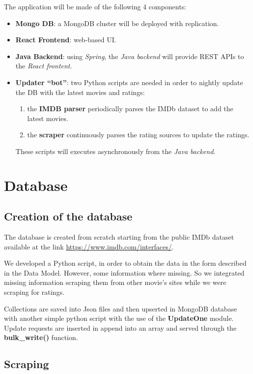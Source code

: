 \documentclass[11pt]{article}
\begin{document}
The application will be made of the following 4 components:
\begin{itemize}
	\item \textbf{Mongo DB}: a MongoDB cluster will be deployed with
		replication.
	\item \textbf{React Frontend}: web-based UI.
	\item \textbf{Java Backend}: using \emph{Spring}, the \emph{Java backend} will provide REST APIs to the \emph{React frontent}.
	\item \textbf{Updater ``bot''}: two Python scripts are needed in order to nightly update the DB with the latest movies and ratings: 
	\begin{enumerate}
		\item the \textbf{IMDB parser} periodically parses the IMDb dataset to add the latest movies.
		\item the \textbf{scraper} continuously parses the rating sources to update the ratings.
	\end{enumerate}
	These scripts will executes asynchronously from the \emph{Java backend}.
\end{itemize}


\section{Database}

\subsection{Creation of the database}
The database is created from scratch starting from the public IMDb dataset available at the link \href{https://www.imdb.com/interfaces/}{https://www.imdb.com/interfaces/}.

We developed a Python script, in order to obtain the data in the form described in the Data Model. However, some information where missing. So we integrated missing information scraping them from other movie's sites while we were scraping for ratings.

Collections are saved into Json files and then upserted in MongoDB database with another simple python script with the use of the \textbf{UpdateOne} module. Update requests are inserted in append into an array and served through the \textbf{bulk\_write()} function.

\subsection{Scraping}
\end{document}
